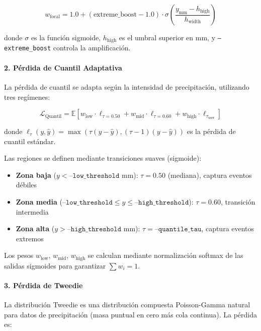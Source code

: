 \begin{equation}
w_{\text{focal}} = 1.0 + (\text{extreme\_boost} - 1.0) \cdot \sigma\left(\frac{y_{\text{mm}} - h_{\text{high}}}{h_{\text{width}}}\right)
\end{equation}

donde $\sigma$ es la función sigmoide, $h_{\text{high}}$ es el umbral superior en mm, y \texttt{--extreme\_boost} controla la amplificación.

\paragraph{2. Pérdida de Cuantil Adaptativa}
La pérdida de cuantil se adapta según la intensidad de precipitación, utilizando tres regímenes:

\begin{equation}
\mathcal{L}_{\text{Quantil}} = \mathbb{E}\left[w_{\text{low}} \cdot \ell_{\tau=0.50} + w_{\text{mid}} \cdot \ell_{\tau=0.60} + w_{\text{high}} \cdot \ell_{\tau_{\text{user}}}\right]
\end{equation}

donde $\ell_\tau(y, \hat{y}) = \max(\tau(y - \hat{y}), (\tau - 1)(y - \hat{y}))$ es la pérdida de cuantil estándar.

Las regiones se definen mediante transiciones suaves (sigmoide):
\begin{itemize}
    \item \textbf{Zona baja} ($y < \texttt{--low\_threshold}$ mm): $\tau = 0.50$ (mediana), captura eventos débiles
    \item \textbf{Zona media} ($\texttt{--low\_threshold} \leq y \leq \texttt{--high\_threshold}$): $\tau = 0.60$, transición intermedia
    \item \textbf{Zona alta} ($y > \texttt{--high\_threshold}$ mm): $\tau = \texttt{--quantile\_tau}$, captura eventos extremos
\end{itemize}

Los pesos $w_{\text{low}}$, $w_{\text{mid}}$, $w_{\text{high}}$ se calculan mediante normalización softmax de las salidas sigmoides para garantizar $\sum w_i = 1$.

\paragraph{3. Pérdida de Tweedie}
La distribución Tweedie es una distribución compuesta Poisson-Gamma natural para datos de precipitación (masa puntual en cero más cola continua). La pérdida es:

